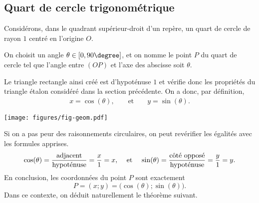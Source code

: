 \subsection{Quart de cercle trigonométrique}
\label{sec:quart-trigo}

\begin{multicols}{2}
Considérons, dans le quadrant supérieur-droit d'un repère, un quart de cercle de rayon $1$ centré en l'origine $O$.

On choisit un angle $\theta \in [0, 90\degree]$, et on nomme le point $P$ du quart de cercle tel que l'angle entre $(OP)$ et l'axe des abscisse soit $\theta$.

Le triangle rectangle ainsi créé est d'hypoténuse $1$ et vérifie donc les propriétés du triangle étalon considéré dans la section précédente.
On a donc, par définition,
	\begin{align*}
		x = \cos(\theta), && \text{ et } && y = \sin(\theta).
	\end{align*}

	\begin{center}
	\texttt{[image: figures/fig-geom.pdf]}
	\end{center}
	
\end{multicols}

Si on a pas peur des raisonnements circulaires, on peut revérifier les égalités avec les formules apprises.
	\begin{align*}
		\cos(\theta) = \dfrac{\text{adjacent}}{\text{hypoténuse}} = \dfrac{x}{1} = x, 
		&& \text{ et } &&
		\sin(\theta) = \dfrac{\text{côté opposé}}{\text{hypoténuse}} = \dfrac{y}1 = y.
	\end{align*}
En conclusion, les coordonnées du point $P$ sont exactement
	\[ P = (x ; y) = \bigl( \cos(\theta) ; \sin(\theta) \bigr). \]
Dans ce contexte, on déduit naturellement le théorème suivant.



